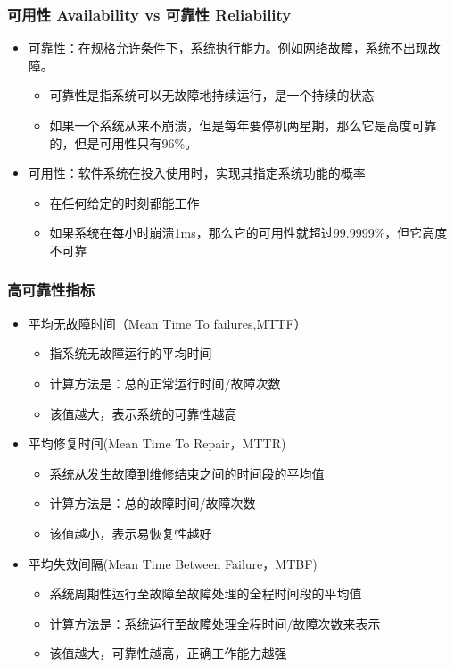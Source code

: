 \begin{frame}[fragile]
    \frametitle{可用性 Availability  vs 可靠性 Reliability}
\begin{itemize}
    \item 可靠性：在规格允许条件下，系统执行能力。例如网络故障，系统不出现故障。
   \begin{itemize}
    \item 可靠性是指系统可以无故障地持续运行，是一个持续的状态
    \item 如果一个系统从来不崩溃，但是每年要停机两星期，那么它是高度可靠的，但是可用性只有96\%。
   \end{itemize}
   \item 可用性：软件系统在投入使用时，实现其指定系统功能的概率
\begin{itemize}
    \item 在任何给定的时刻都能工作
    \item 如果系统在每小时崩溃1ms，那么它的可用性就超过99.9999\%，但它高度不可靠
\end{itemize}
\end{itemize}
\end{frame}


\begin{frame}[fragile]
    \frametitle{高可靠性指标}
\begin{itemize}
    \item 平均无故障时间（Mean Time To failures,MTTF） 
\begin{itemize}
    \item 指系统无故障运行的平均时间
    \item 计算方法是：总的正常运行时间/故障次数
    \item 该值越大，表示系统的可靠性越高
\end{itemize} \pause
    \item 平均修复时间(Mean Time To Repair，MTTR) 
 \begin{itemize}
    \item 系统从发生故障到维修结束之间的时间段的平均值
    \item 计算方法是：总的故障时间/故障次数
    \item 该值越小，表示易恢复性越好
\end{itemize}  \pause
 \item 平均失效间隔(Mean Time Between Failure，MTBF) 
 \begin{itemize}
    \item 系统周期性运行至故障至故障处理的全程时间段的平均值
    \item 计算方法是：系统运行至故障处理全程时间/故障次数来表示
    \item 该值越大，可靠性越高，正确工作能力越强
\end{itemize}  
\end{itemize}
\end{frame}





